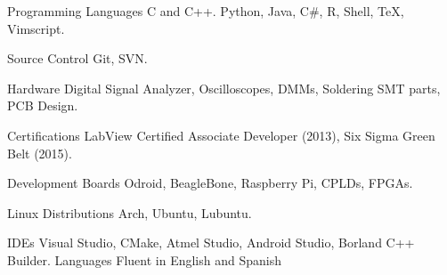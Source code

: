 
\begin{cvskills}


	\cvskill
		{Programming Languages}
			{C and C++. Python, Java, C\#, R, Shell, \TeX, Vimscript.}

	\cvskill
		{Source Control}
			{Git, SVN.}

	\cvskill
		{Hardware}
			{Digital Signal Analyzer, Oscilloscopes, DMMs, Soldering SMT parts, PCB Design.}

	\cvskill
		{Certifications}
			{LabView Certified Associate Developer (2013), Six Sigma Green Belt (2015).}

	\cvskill
		{Development Boards}
			{Odroid, BeagleBone, Raspberry Pi, CPLDs, FPGAs.}

	\cvskill
		{Linux Distributions}
			{Arch, Ubuntu, Lubuntu.}

	\cvskill
		{IDEs}
			{Visual Studio, CMake, Atmel Studio, Android Studio, Borland C++ Builder.}
	\cvskill
		{Languages}
			{Fluent in English and Spanish}

\end{cvskills}
